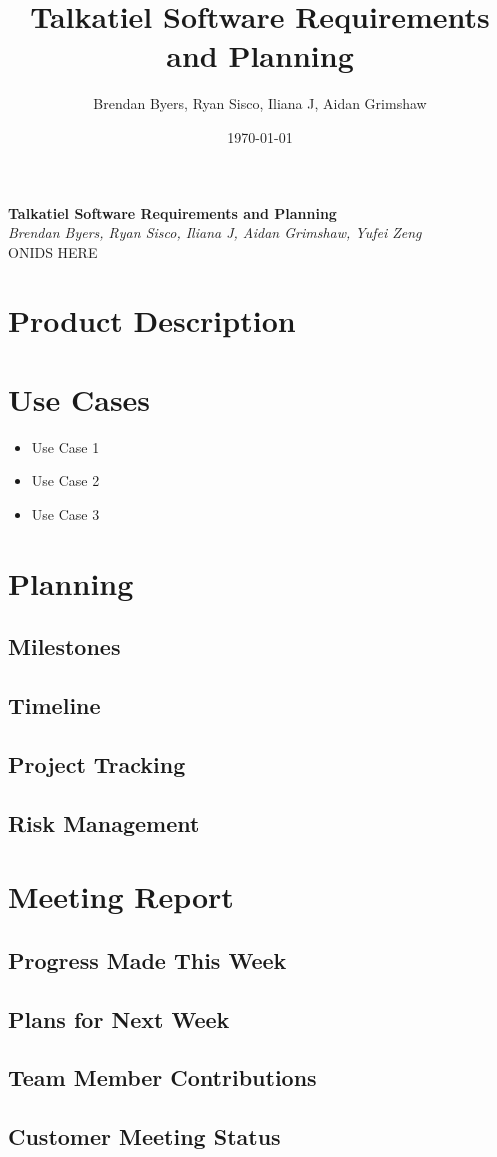 \documentclass[12pt]{article}
\title{Talkatiel Software Requirements and Planning}
\author{Brendan Byers, Ryan Sisco, Iliana J, Aidan Grimshaw}
\date{\today}
\begin{document}
\begin{center}
      \Large\textbf{Talkatiel Software Requirements and Planning}\\
      \large\textit{Brendan Byers, Ryan Sisco, Iliana J, Aidan Grimshaw, Yufei Zeng}\\
      \large{ONIDS HERE}\\
   \end{center}

\section{Product Description}

\section{Use Cases}

\begin{itemize}
  \item Use Case 1
  \item Use Case 2
  \item Use Case 3
\end{itemize}

\section{Planning}

\subsection{Milestones}
\subsection{Timeline}
\subsection{Project Tracking}
\subsection{Risk Management}


\section{Meeting Report}

\subsection{Progress Made This Week}
\subsection{Plans for Next Week}
\subsection{Team Member Contributions}
\subsection{Customer Meeting Status}
\end{document}
